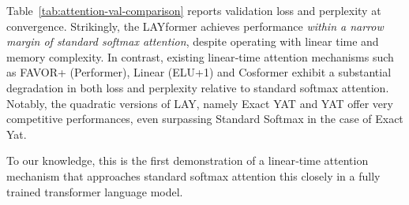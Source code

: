 \documentclass{article}
\begin{document}
Table~\ref{tab:attention-val-comparison} reports validation loss and perplexity at convergence.
Strikingly, the LAYformer achieves performance \emph{within a narrow margin of standard softmax attention},
despite operating with linear time and memory complexity.
In contrast, existing linear‑time attention mechanisms such as FAVOR+ (Performer), Linear (ELU+1) and Cosformer exhibit a
substantial degradation in both loss and perplexity relative to standard softmax attention. Notably, the quadratic versions of LAY, namely Exact YAT and YAT offer very competitive performances, even surpassing Standard Softmax in the case of Exact Yat. 

To our knowledge, this is the first demonstration of a linear‑time attention mechanism that approaches
standard softmax attention this closely in a fully trained transformer language model.
\end{document}
